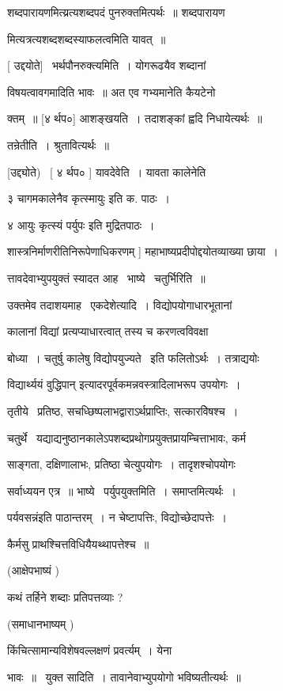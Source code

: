 \documentclass[11pt, openany]{book}
\begin{document}
शब्दपारायणमित्य्रत्यशब्दपदं पुनरुक्तमित्पर्थः~॥ शब्दपारायण \textendash\ 

मित्यत्रत्यशब्दशब्दस्याफलत्वमिति यावत्~॥ 

[ उद्दयोते] \textendash\ भर्थपौनरुक्त्यमिति~। योगरूढयैव शब्दानां 

विषयत्वावगमादिति भावः~॥ अत एव गभ्यमानेति कैयटेनो \textendash\ 

क्तम्~॥ [४ र्थप०] आशङ्खयति~। तदाशङ्कां ह्वदि निधायेत्यर्थः~॥ 

तन्रेतीति~। श्रुतावित्यर्थः~॥ 

[उद्द्योते) \textendash\ [ ४ र्थप० ] यावदेवेति~। यावता कालेनेति 

३ {\qt चागमकालेनैव कृत्स्मायुः} इति क. पाठः~। 

४ {\qt आयुः कृत्स्यं पर्युपः इति मुद्रितपाठः~।} 

शास्त्रनिर्माणरीतिनिरूपेणाधिकरणम् ] महाभाष्यप्रदीपोद्दयोतव्याख्या
छाया~। 



त्तावदेवाभ्युपयुक्तं स्यादत आह \textendash\ भाष्ये \textendash\ चतुर्भिरिति~॥ 

उक्तमेव तदाशयमाह \textendash\ एकदेशेत्यादि~। विद्योपयोगाधारभूतानां 

कालानां विद्यां प्रत्यप्याधारत्वात् तस्य च करणत्वविवक्षा 

बोध्या~। चतुर्षु कालेषु विद्योपयुज्यते \textendash\ इति फलितोऽर्थः~। तत्राद्ययोः 

{\qt विद्यार्थ्ययं वुद्धिपान्} इत्यादरपूर्वकमन्नवस्त्रादिलाभरूप उपयोगः~। 

तृतीये \textendash\ प्रतिष्ठ, सचध्छिष्पलाभद्वाराऽर्थप्राप्तिः, सत्कारविेषश्च~। 

चतु्र्थे \textendash\ यद्याद्यनुष्ठानकालेऽपशब्दप्रथोगप्रयुक्तप्रायम्चित्ताभावः,
कर्म \textendash\ 

साङ्गता, दक्षिणालाभः, प्रतिष्ठा चेत्युपयोगः~। तादृशश्चोपयोगः 

सर्वाध्ययन एत्र~॥ भाष्ये \textendash\ पर्युपयुक्तमिति~। समाप्तमित्यर्थः~। 

{\qt पर्यवसन्नं}इति पाठान्तरम्~। न चेष्टापत्तिः, विद्योच्छेदापत्तेः~। 

कैर्मसु प्राथश्चित्तविधियैयथ्थापत्तेश्च~॥ 

(आक्षेपभाष्यं ) 

कथं तर्हिने शब्दाः प्रतिपत्तव्याः ? 

(समाधानभाष्यम् ) 

किंचित्सामान्यविशेषवल्लक्षणं प्रवर्त्यम्~। येना \textendash\ 

भावः~॥ \textendash\ युक्त सादिति~। तावानेवाभ्युपयोगो भविष्यतीत्यर्थः~॥ 
\end{document}
